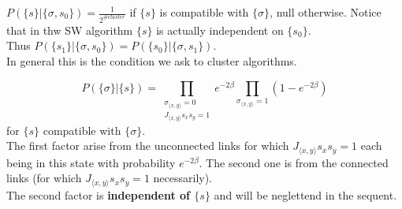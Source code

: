 \documentclass[12pt,handout]{beamer}
\begin{document}
\begin{frame}
\begin{center}

$P \left( \lbrace s \rbrace | \lbrace \sigma, s_0 \rbrace \right) =
 \frac{1}{2^{\# cluster}}$ if $\lbrace s \rbrace$ is compatible with $\lbrace \sigma \rbrace$, null otherwise. Notice that in thw SW algorithm $\lbrace s \rbrace$ is actually independent on $\lbrace s_0 \rbrace$.\\
\vspace{20pt} 
Thus {\large $P \left( \lbrace s_1 \rbrace | \lbrace \sigma, s_0 \rbrace \right) = P \left( \lbrace s_0 \rbrace | \lbrace \sigma, s_1 \rbrace \right)$}.\\
\vspace{20pt}
In general this is the condition we ask to cluster algorithms.




\end{center}
\end{frame}

\begin{frame}
\begin{center}

{\large
\[P \left( \lbrace \sigma \rbrace | \lbrace s \rbrace \right) =
\prod_{ \substack{ \sigma_{\langle x, y \rangle} = 0 \\ J_{\langle x, y \rangle} s_x s_y = 1}} e^{-2 \beta} \prod_{\sigma_{\langle x, y \rangle} = 1} \left( 1- e^{-2 \beta } \right)
\]} for $\lbrace s \rbrace$ compatible with $\lbrace \sigma \rbrace$.\\
\vspace{20pt}
The first factor arise from the unconnected links for which $J_{\langle x, y \rangle} s_x s_y = 1$ each being in this state with probability $e^{ - 2 \beta }$. The second one is from the connected links (for which $J_{\langle x, y \rangle} s_x s_y = 1$ necessarily).\\
\vspace{20pt}
The second factor is \textbf{independent of $\lbrace s \rbrace$} and will be neglettend in the sequent.

\end{center}
\end{frame}
\end{document}
